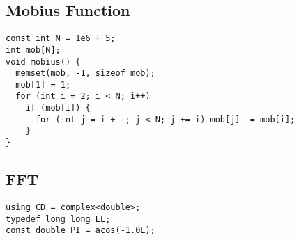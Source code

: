 \documentclass[FSZ,a4paper,onesided]{article}
\begin{document}
\begin{multicols*}{\COLS}
\subsection{Mobius Function}
\begin{lstlisting}
const int N = 1e6 + 5;
int mob[N];
void mobius() {
  memset(mob, -1, sizeof mob);
  mob[1] = 1;
  for (int i = 2; i < N; i++)
    if (mob[i]) {
      for (int j = i + i; j < N; j += i) mob[j] -= mob[i];
    }
}

\end{lstlisting}
\subsection{FFT}
\begin{lstlisting}
using CD = complex<double>;
typedef long long LL;
const double PI = acos(-1.0L);


\end{lstlisting}
\end{multicols*}
\end{document}
